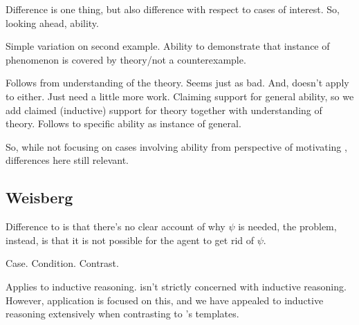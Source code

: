 \begin{note}
  \color{later}
  Difference is one thing, but also difference with respect to cases of interest.
  So, looking ahead, ability.

  Simple variation on second example.
  Ability to demonstrate that instance of phenomenon is covered by theory/not a counterexample.

  Follows from understanding of the theory.
  Seems just as bad.
  And, \citeauthor{Wright:2011wn} doesn't apply to either.
  Just need a little more work.
  Claiming support for general ability, so we add claimed (inductive) support for theory together with understanding of theory.
  Follows to specific ability as instance of general.

  So, while not focusing on cases involving ability from perspective of motivating \nI{}, differences here still relevant.
\end{note}

\subsection{Weisberg}

\begin{note}
  \color{red}
  Difference to \wnf{} is that there's no clear account of why \(\psi\) is needed, the problem, instead, is that it is not possible for the agent to get rid of \(\psi\).
\end{note}

\begin{note}
  Case.
  Condition.
  Contrast.

  Applies to inductive reasoning.
  \nI{} isn't strictly concerned with inductive reasoning.
  However, application is focused on this, and we have appealed to inductive reasoning extensively when contrasting \nI{} to \citeauthor{Wright:2011wn}'s templates.
\end{note}

